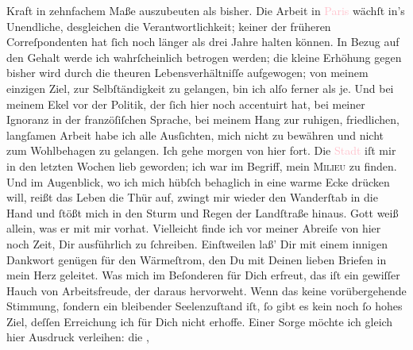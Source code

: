                Kraft in zehnfachem Maße auszubeuten als bisher. Die Arbeit in \textcolor{pink}{Paris}{}\ledrightnote{\textcolor{pink}{Paris}} wächſt in’s Unendliche, desgleichen die
               Verantwortlichkeit; keiner der früheren Correſpondenten {\pb}hat ſich noch länger als drei Jahre halten können.
               In Bezug auf den Gehalt werde ich wahrſcheinlich betrogen werden; die kleine Erhöhung
               gegen bisher wird durch die theuren Lebensverhältniſſe aufgewogen; von meinem
               einzigen Ziel, zur Selbſtändigkeit zu  gelangen, bin ich alſo ferner als je. Und bei meinem Ekel vor der Politik, der
               ſich hier noch  accentuirt hat, bei meiner Ignoranz
               in der franzöſiſchen Sprache, bei meinem Hang zur ruhigen, \strikeout{\textcolor{gray}{ſt}} friedlichen, langſamen Arbeit habe ich alle Ausſichten, mich nicht zu bewähren
               und nicht zum Wohlbehagen zu gelangen. Ich gehe morgen
               von hier fort. Die \textcolor{pink}{Stadt}{} iſt
               mir in den letzten Wochen lieb geworden; ich war im Begriff, mein \textsc{Milieu} zu finden. Und im Augenblick, wo ich mich hübſch
               behaglich in eine warme Ecke drücken will, {\pb} reißt das Leben die Thür auf, zwingt mir wieder
               den Wanderſtab  in die Hand und ſtößt mich in
               den Sturm und Regen der Landſtraße hinaus. Gott weiß allein, was er mit mir
               vorhat.\pend
           \pstart
           Vielleicht finde ich vor meiner Abreiſe von hier noch Zeit, Dir ausführlich zu
               ſchreiben. Einſtweilen laß’ Dir mit einem innigen Dankwort genügen für den
               Wärmeſtrom, den Du mit Deinen lieben Briefen in mein Herz geleitet. Was mich im
               Beſonderen für Dich erfreut, das iſt ein gewiſſer Hauch von Arbeitsfreude, der daraus
               hervorweht. Wenn das keine vorübergehende Stimmung, ſondern ein bleibender
               Seelenzuſtand iſt, ſo gibt es kein noch ſo hohes Ziel, deſſen Erreichung ich für Dich
               nicht erhoffe. Einer Sorge möchte ich gleich hier Ausdruck verleihen:  die \label{K_L02670-1v}\label{K_L02670-1h},

